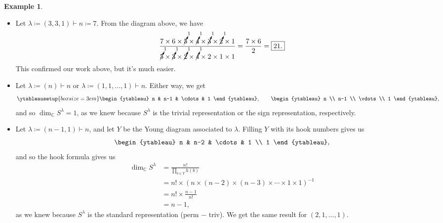 \documentclass[12pt]{article}
\newcommand{\cx}{\mathbb{C}}
\newcommand\inv[1]{#1^{-1}}
\newcommand\paren[1]{\left( #1 \right)}
\theoremstyle{definition}
\newtheorem{example}{Example}[section]
\begin{document}
\begin{example}
    \noindent
    \begin{itemize}
        \item Let $\lambda \coloneqq  (3,3,1) \vdash n\coloneqq  7$. From the diagram above, we have 
        \begin{equation*}
            \frac{ 7 \times 6 \times \cancelto{1}{5} \times \cancelto{1}{4} \times \cancelto{1}{3} \times \cancelto{1}{2} \times 1 }{ \cancelto{1}{5} \times \cancelto{1}{3} \times \cancelto{1}{2} \times \cancelto{1}{4} \times 2 \times 1 \times 1} = \frac{7 \times 6}{2} = \boxed{21.}
        \end{equation*}
        This confirmed our work above, but it's much easier.
        \item Let $\lambda \coloneqq  (n) \vdash n$ or $\lambda \coloneqq  \paren{ 1 , 1 , \dotsc , 1 } \vdash n$. Either way, we get
        \begin{equation*}
            \ytableausetup{boxsize = 3em}
            \begin{ytableau}
                n & n-1 & \cdots & 1
            \end{ytableau},
            \qquad
            \begin{ytableau}
                n \\
                n-1 \\
                \vdots \\
                1
            \end{ytableau},
        \end{equation*}
        and so $\dim_{\cx} S^{\lambda} = 1$, as we knew because $S^{\lambda}$ is the trivial representation or the sign representation, respectively.
        \item Let $\lambda \coloneqq  (n-1,1) \vdash n$, and let $Y$ be the Young diagram associated to $\lambda$. Filling $Y$ with its hook numbers gives us
        \begin{equation*}
            \begin{ytableau}
                n & n-2 & \cdots & 1 \\
                1
            \end{ytableau},
        \end{equation*}
        and so the hook formula gives us
        \begin{align*}
            \dim_{\cx} S^{\lambda} & = \frac{n!}{ \prod\limits_{b \in Y} h(b) } \\
            & = n! \times \inv{ \paren{ n \times (n-2)\times (n-3) \times \dotsm \times 1 \times 1 } } \\
            & = n! \times \frac{n-1}{n!} \\
            & = n-1,
        \end{align*}
        as we knew because $S^{\lambda}$ is the standard representation (perm $-$ triv). We get the same result for $(2,1,\dotsc,1)$.
    \end{itemize}
\end{example}
\end{document}
